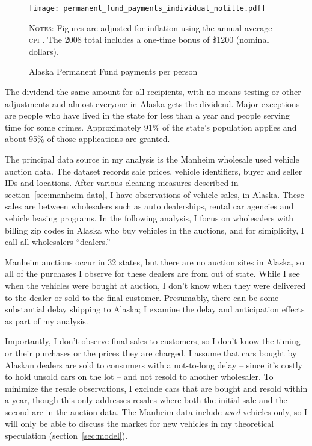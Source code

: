 \documentclass[11pt,letterpaper,oneside]{article}
\newcommand{\snippet}[1]{\hspace{-0.15em}}
\begin{document}
\begin{doublespacing}
\begin{figure}[bht]
    \caption{\large Alaska Permanent Fund payments per person}
    \label{fig:permanent-fund-payments-individual}
    \texttt{[image: permanent\_fund\_payments\_individual\_notitle.pdf]}

\noindent\textsc{Notes:}
		Figures are adjusted for inflation using the annual average \textsc{cpi} \parencite{fred_inflation}.
		The 2008 total includes a one-time bonus of \$1200 (nominal dollars).
\end{figure}


The dividend the same amount for all recipients, with no means testing or other adjustments and almost everyone in Alaska gets the dividend.
Major exceptions are people who have lived in the state for less than a year and people serving time for some crimes.
Approximately 91\% of the state's population applies and about 95\% of those applications are granted.


The principal data source in my analysis is the Manheim wholesale used vehicle auction data.
The dataset records sale prices, vehicle identifiers, buyer and seller IDs and locations.
After various cleaning measures described in section~\ref{sec:manheim-data}, I have
\snippet{auctions_cleaned_total_obs_count.tex}
observations of vehicle sales,
\snippet{auctions_cleaned_alaska_obs_count.tex} in Alaska.
These sales are between wholesalers such as auto dealerships, rental car agencies and vehicle leasing programs.
In the following analysis, I focus on wholesalers with billing zip codes in Alaska who buy vehicles in the auctions, and for simiplicity, I call all wholesalers ``dealers.''

Manheim auctions occur in 32 states, but there are no auction sites in Alaska, so all of the purchases I observe for these dealers are from out of state.
While I see when the vehicles were bought at auction, I don't know when they were delivered to the dealer or sold to the final customer.
Presumably, there can be some substantial delay shipping to Alaska; I examine the delay and anticipation effects as part of my analysis.

Importantly, I don't observe final sales to customers, so I don't know the timing or their purchases or the prices they are charged.
I assume that cars bought by Alaskan dealers are sold to consumers with a not\hyp{}to\hyp{}long delay -- since it's costly to hold unsold cars on the lot -- and not resold to another wholesaler.
To minimize the resale observations, I exclude cars that are bought and resold within a year, though this only addresses resales where both the initial sale and the second are in the auction data.
The Manheim data include \emph{used} vehicles only, so I will only be able to discuss the market for new vehicles in my theoretical speculation (section~\ref{sec:model}).



\end{doublespacing}
\end{document}
